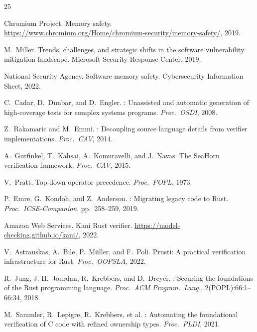 \documentclass[11pt,a4paper]{article}
\begin{document}

\begin{thebibliography}{25}

Chromium Project.
\newblock Memory safety.
\newblock \url{https://www.chromium.org/Home/chromium-security/memory-safety/}, 2019.

M.~Miller.
\newblock Trends, challenges, and strategic shifts in the software vulnerability mitigation landscape.
\newblock Microsoft Security Response Center, 2019.

National Security Agency.
\newblock Software memory safety.
\newblock Cybersecurity Information Sheet, 2022.

C.~Cadar, D.~Dunbar, and D.~Engler.
: Unassisted and automatic generation of high-coverage tests for complex systems programs.
\newblock \emph{Proc.\ OSDI}, 2008.

Z.~Rakamaric and M.~Emmi.
: Decoupling source language details from verifier implementations.
\newblock \emph{Proc.\ CAV}, 2014.

A.~Gurfinkel, T.~Kahsai, A.~Komuravelli, and J.~Navas.
\newblock The {SeaHorn} verification framework.
\newblock \emph{Proc.\ CAV}, 2015.

V.~Pratt.
\newblock Top down operator precedence.
\newblock \emph{Proc.\ POPL}, 1973.

P.~Emre, G.~Kondoh, and Z.~Anderson.
: Migrating legacy code to {Rust}.
\newblock \emph{Proc.\ ICSE-Companion}, pp.\ 258--259, 2019.

Amazon Web Services.
\newblock Kani {Rust} verifier.
\newblock \url{https://model-checking.github.io/kani/}, 2022.

V.~Astrauskas, A.~Bi\-le, P.~M\"uller, and F.~Poli.
\newblock Prusti: A practical verification infrastructure for {Rust}.
\newblock \emph{Proc.\ OOPSLA}, 2022.

R.~Jung, J.-H.~Jourdan, R.~Krebbers, and D.~Dreyer.
: Securing the foundations of the {Rust} programming language.
\newblock \emph{Proc.\ ACM Program.\ Lang.}, 2(POPL):66:1--66:34, 2018.

M.~Sammler, R.~Lepigre, R.~Krebbers, et al.
: Automating the foundational verification of {C} code with refined ownership types.
\newblock \emph{Proc.\ PLDI}, 2021.


\end{thebibliography}
\end{document}
